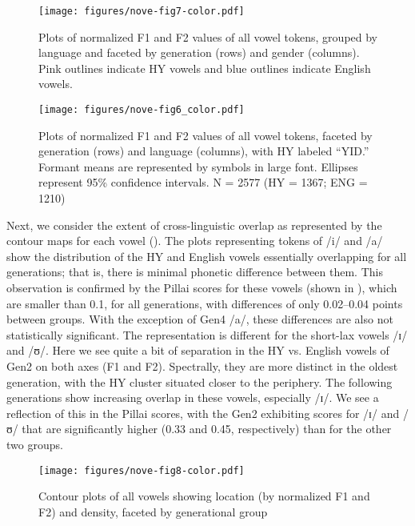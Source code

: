 \documentclass[output=paper]{langsci/langscibook}
\begin{document}
\begin{figure}
\texttt{[image: figures/nove-fig7-color.pdf]}
\caption{Plots of normalized F1 and F2 values of all vowel tokens, grouped by language and faceted by generation (rows) and gender (columns). Pink outlines indicate HY vowels and blue outlines indicate English vowels.}\label{fig:nove:7}
\end{figure}

\begin{figure}
\texttt{[image: figures/nove-fig6\_color.pdf]}
\caption{Plots of normalized F1 and F2 values of all vowel tokens, faceted by generation (rows) and language (columns), with HY labeled “YID.” Formant means are represented by symbols in large font. Ellipses represent 95\% confidence intervals. N = 2577 (HY = 1367; ENG = 1210)}\label{fig:nove:6}
\end{figure} 

Next, we consider the extent of cross-linguistic overlap as represented by the contour maps for each vowel (). The plots representing tokens of /i/ and /a/ show the distribution of the HY and English vowels essentially overlapping for all generations; that is, there is minimal phonetic difference between them. This observation is confirmed by the Pillai scores for these vowels (shown in ), which are smaller than 0.1, for all generations, with differences of only 0.02--0.04 points between groups. With the exception of Gen4 /a/, these differences are also not statistically significant. The representation is different for the short-lax vowels /ɪ/ and /ʊ/. Here we see quite a bit of separation in the HY vs. English vowels of Gen2 on both axes (F1 and F2). Spectrally, they are more distinct in the oldest generation, with the HY cluster situated closer to the periphery. The following generations show increasing overlap in these vowels, especially /ɪ/. We see a reflection of this in the Pillai scores, with the Gen2 exhibiting scores for /ɪ/ and /ʊ/ that are significantly higher (0.33 and 0.45, respectively) than for the other two groups.


\begin{figure}
\texttt{[image: figures/nove-fig8-color.pdf]}
\caption{Contour plots of all vowels showing location (by normalized F1 and F2) and density, faceted by generational group}
\label{fig:nove:8}
\end{figure}
\end{document}
